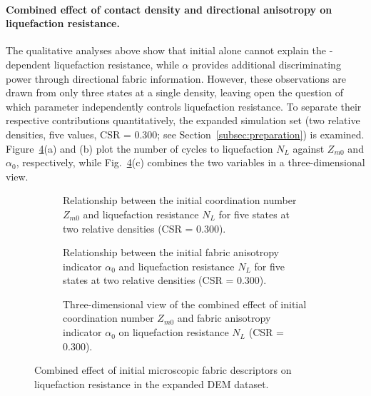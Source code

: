 \paragraph{Combined effect of contact density and directional anisotropy on liquefaction resistance.}
The qualitative analyses above show that initial \Zm{} alone cannot explain the \Kzero{}-dependent liquefaction resistance, while $\alpha$ provides additional discriminating power through directional fabric information. However, these observations are drawn from only three \Kzero{} states at a single density, leaving open the question of which parameter independently controls liquefaction resistance. To separate their respective contributions quantitatively, the expanded simulation set (two relative densities, five \Kzero{} values, CSR = 0.300; see Section~\ref{subsec:preparation}) is examined. Figure~\ref{fig:fabric_liq_pair}(a) and (b) plot the number of cycles to liquefaction $N_L$ against $Z_{m0}$ and $\alpha_0$, respectively, while Fig.~\ref{fig:fabric_liq_pair}(c) combines the two variables in a three-dimensional view.

\begin{figure}[t]
  \centering
  \begin{subfigure}[t]{0.455\textwidth}
    \centering
    \caption{Relationship between the initial coordination number $Z_{m0}$ and liquefaction resistance $N_L$ for five \Kzero{} states at two relative densities (CSR = 0.300).}
    \label{fig:fabric_liq_pair_zm}
  \end{subfigure}
  \hfill
  \begin{subfigure}[t]{0.455\textwidth}
    \centering
    \caption{Relationship between the initial fabric anisotropy indicator $\alpha_0$ and liquefaction resistance $N_L$ for five \Kzero{} states at two relative densities (CSR = 0.300).}
    \label{fig:fabric_liq_pair_alpha}
  \end{subfigure}

  \vspace{0.5em}

  \begin{subfigure}[t]{0.455\textwidth}
    \centering
    \caption{Three-dimensional view of the combined effect of initial coordination number $Z_{m0}$ and fabric anisotropy indicator $\alpha_0$ on liquefaction resistance $N_L$ (CSR = 0.300).}
    \label{fig:fabric_liq_pair_3d}
  \end{subfigure}
  \caption{Combined effect of initial microscopic fabric descriptors on liquefaction resistance in the expanded DEM dataset.}
  \label{fig:fabric_liq_pair}
\end{figure}

